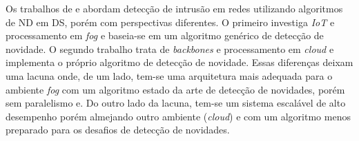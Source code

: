 

Os trabalhos de  e  abordam
detecção de intrusão em redes utilizando algoritmos de ND em DS, porém com
perspectivas diferentes.
O primeiro investiga \emph{IoT} e processamento em \emph{fog} e baseia-se em um
algoritmo genérico de detecção de novidade.
O segundo trabalho trata de \emph{backbones} e processamento em \emph{cloud} e
implementa o próprio algoritmo de detecção de novidade.
Essas diferenças deixam uma lacuna onde, de um lado, tem-se uma
arquitetura mais adequada para o ambiente \emph{fog} com um algoritmo estado da arte de
detecção de novidades, porém sem paralelismo e.
Do outro lado da lacuna, tem-se um sistema
escalável de alto desempenho porém almejando outro ambiente (\emph{cloud}) e
com um algoritmo menos preparado para os desafios de detecção de 
novidades.


